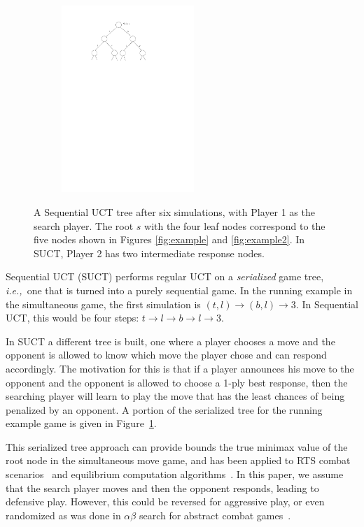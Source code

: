 \documentclass[conference]{IEEEtran}
\newcommand{\ie}{{\it i.e.,}~}
\begin{document}
\begin{figure}[b!]
\centering
\begin{subfigure}{5cm}
\centering
\includegraphics[width=5.0cm]{figures/tree4}\\
\end{subfigure}
\caption{A Sequential UCT tree after six simulations, with Player 1 as the search player. The root $s$ with the four 
leaf nodes correspond to the five nodes shown in Figures \ref{fig:example} and \ref{fig:example2}. In SUCT, Player 2 has two intermediate 
response nodes. \label{fig:example3}}
\end{figure}

Sequential UCT (SUCT) performs regular UCT on a {\it serialized} game tree, \ie one that is turned into a 
purely sequential game. 
In the running example in the simultaneous game, the first simulation is $(t,l) \rightarrow (b,l) \rightarrow 3$. 
In Sequential UCT, this would be four steps: $t \rightarrow l \rightarrow b \rightarrow l \rightarrow 3$. 

In SUCT a different tree is built, one where a player chooses a move and the opponent is 
allowed to know which move the player chose and can respond accordingly. 
The motivation for this is that if a player
announces his move to the opponent and the opponent is allowed to choose a 1-ply best response, then the searching player
will learn to play the move that has the least chances of being penalized by an opponent. 
A portion of the serialized tree for the running example game is given in Figure~\ref{fig:example3}. 

This serialized tree approach can provide bounds the true minimax value of the root node in the simultaneous move game,
and has been applied to RTS combat scenarios~\cite{Churchill2012Fast} and equilibrium computation algorithms~\cite{Bosansky13Using}. 
In this paper, we assume that the search player moves and then the opponent responds, leading to defensive play. However, this could be 
reversed for aggressive play, or even randomized as was done in $\alpha\beta$ search for abstract combat games~\cite{Kovarsky05RAB}. 
\end{document}
